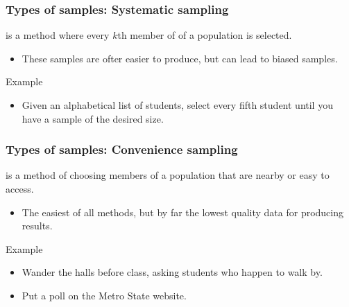 \documentclass[xcolor=table, handout]{beamer}
\begin{document}
\begin{frame}
\frametitle{Types of samples: Systematic sampling}

\begin{block}{}
\large {} is a method where every $k$th member of of a population is selected.
\begin{itemize}
\item These samples are ofter easier to produce, but can lead to biased samples. 
\end{itemize}
\end{block}
\pause
\begin{exampleblock}{Example}
\begin{itemize}
\item Given an alphabetical list of students, select every fifth student until you have a sample of the desired size.
\end{itemize}
\end{exampleblock}

\end{frame}

\begin{frame}
\frametitle{Types of samples: Convenience sampling}

\begin{block}{}
\large {} is a method of choosing members of a population that are nearby or easy to access.
\begin{itemize}
\item The easiest of all methods, but by far the lowest quality data for producing results.
\end{itemize}
\end{block}
\pause
\begin{exampleblock}{Example}
\begin{itemize}
\item Wander the halls before class, asking students who happen to walk by.
\item Put a poll on the Metro State website.
\end{itemize}

\end{exampleblock}
\end{frame}
\end{document}
